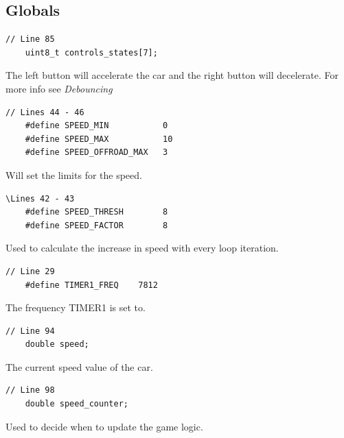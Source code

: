 \documentclass{article}
\begin{document}
\subsection*{Globals}
\begin{lstlisting}[style=CStyle]
	// Line 85
	uint8_t controls_states[7];
\end{lstlisting}
The left button will accelerate the car and the right button will decelerate. For more info see \emph{Debouncing}
\begin{lstlisting}[style=CStyle]
	// Lines 44 - 46
	#define SPEED_MIN           0      
	#define SPEED_MAX           10
	#define SPEED_OFFROAD_MAX   3
\end{lstlisting}
Will set the limits for the speed.
\begin{lstlisting}[style=CStyle]
	\Lines 42 - 43
	#define SPEED_THRESH        8
	#define SPEED_FACTOR        8
\end{lstlisting}
Used to calculate the increase in speed with every loop iteration.
\begin{lstlisting}[style=CStyle]
	// Line 29
	#define TIMER1_FREQ    7812
\end{lstlisting}
The frequency TIMER1 is set to. 
\begin{lstlisting}[style=CStyle]
	// Line 94
	double speed;
\end{lstlisting}
The current speed value of the car.
\begin{lstlisting}[style=CStyle]
	// Line 98
	double speed_counter;
\end{lstlisting}
Used to decide when to update the game logic. 
\newline
\end{document}
